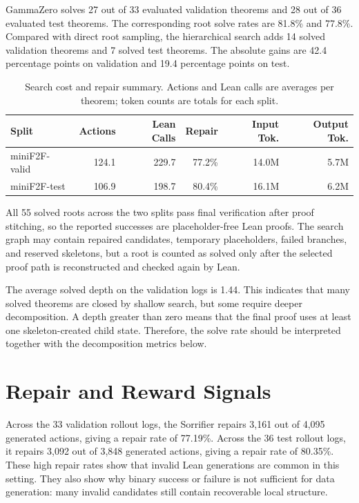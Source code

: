 \documentclass[en]{uet_awesome_thesis/uet-awesome-thesis}
\begin{document}
GammaZero solves 27 out of 33 evaluated validation theorems and 28 out of 36 evaluated test theorems.
The corresponding root solve rates are 81.8\% and 77.8\%. Compared with direct root sampling, the
hierarchical search adds 14 solved validation theorems and 7 solved test theorems. The absolute gains are
42.4 percentage points on validation and 19.4 percentage points on test.

\begin{table}[h]
\centering
\scriptsize
\setlength{\tabcolsep}{4pt}
\begin{tabular}{@{}lrrrrr@{}}
\toprule
Split & Actions & Lean Calls & Repair & Input Tok. & Output Tok. \\
\midrule
miniF2F-valid & 124.1 & 229.7 & 77.2\% & 14.0M & 5.7M \\
miniF2F-test & 106.9 & 198.7 & 80.4\% & 16.1M & 6.2M \\
\bottomrule
\end{tabular}
\caption{Search cost and repair summary. Actions and Lean calls are averages per theorem; token counts are totals for each split.}
\label{tab:resource-results}
\end{table}

All 55 solved roots across the two splits pass final verification after proof stitching, so the reported
successes are placeholder-free Lean proofs. The search graph may contain repaired candidates, temporary
placeholders, failed branches, and reserved skeletons, but a root is counted as solved only after the
selected proof path is reconstructed and checked again by Lean.

The average solved depth on the validation logs is 1.44. This indicates that many solved theorems are closed by shallow search, but some require deeper decomposition. A depth greater than zero means that the final proof uses at least one skeleton-created child state. Therefore, the solve rate should be interpreted together with the decomposition metrics below.

\section{Repair and Reward Signals}

Across the 33 validation rollout logs, the Sorrifier repairs 3,161 out of 4,095 generated actions,
giving a repair rate of 77.19\%. Across the 36 test rollout logs, it repairs 3,092 out of 3,848
generated actions, giving a repair rate of 80.35\%. These high repair rates show that invalid Lean
generations are common in this setting. They also show why binary success or failure is not sufficient for
data generation: many invalid candidates still contain recoverable local structure.
\end{document}
